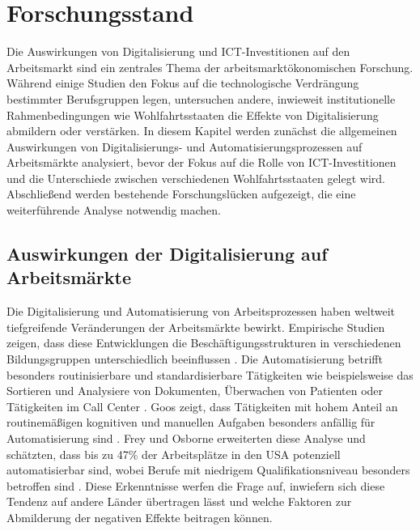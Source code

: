 
\section{Forschungsstand}

Die Auswirkungen von Digitalisierung und \ac{ICT}-Investitionen auf den Arbeitsmarkt sind ein 
zentrales Thema der arbeitsmarktökonomischen Forschung. Während einige Studien den Fokus auf die 
technologische Verdrängung bestimmter Berufsgruppen legen, untersuchen andere, inwieweit 
institutionelle Rahmenbedingungen wie Wohlfahrtsstaaten die Effekte von Digitalisierung abmildern 
oder verstärken. In diesem Kapitel werden zunächst die allgemeinen Auswirkungen von 
Digitalisierungs- und Automatisierungsprozessen auf Arbeitsmärkte analysiert, bevor der Fokus auf 
die Rolle von \ac{ICT}-Investitionen und die Unterschiede zwischen verschiedenen 
Wohlfahrtsstaaten gelegt wird. Abschließend werden bestehende Forschungslücken aufgezeigt, die 
eine weiterführende Analyse notwendig machen.


\subsection{Auswirkungen der Digitalisierung auf Arbeitsmärkte}

Die Digitalisierung und Automatisierung von Arbeitsprozessen haben weltweit tiefgreifende 
Veränderungen der Arbeitsmärkte bewirkt. Empirische Studien zeigen, dass diese Entwicklungen die 
Beschäftigungsstrukturen in verschiedenen Bildungsgruppen unterschiedlich beeinflussen 
\parencite[vgl.][S. 1588–1590]{autor2013thegrowth}. Die Automatisierung betrifft besonders 
routinisierbare und standardisierbare Tätigkeiten wie beispielsweise das Sortieren und Analysiere 
von Dokumenten, Überwachen von Patienten oder Tätigkeiten im Call Center 
\parencite[vgl.][S. 19–20]{frey2013thefuture}. Goos zeigt, dass Tätigkeiten mit hohem Anteil 
an routinemäßigen kognitiven und manuellen Aufgaben besonders anfällig für Automatisierung sind 
\parencite[vgl.][S. 2521]{goos2014explaining}. Frey und Osborne erweiterten diese Analyse und 
schätzten, dass bis zu 47\% der Arbeitsplätze in den USA potenziell automatisierbar sind, wobei 
Berufe mit niedrigem Qualifikationsniveau besonders betroffen sind 
\parencite[S. 39–41]{frey2013thefuture}. Diese Erkenntnisse  werfen die Frage auf, inwiefern sich 
diese Tendenz auf andere Länder übertragen lässt und welche Faktoren zur Abmilderung der 
negativen Effekte beitragen können.

